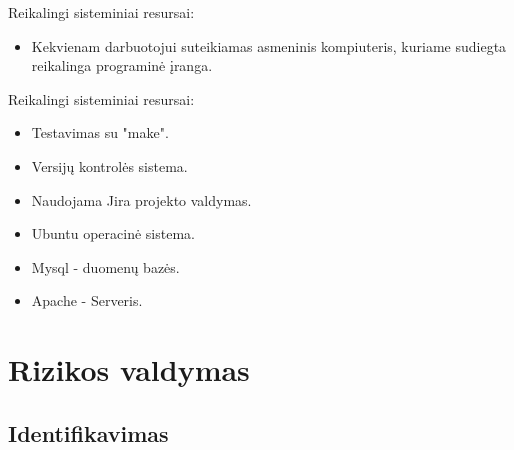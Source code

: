 \documentclass[a4paper,12pt]{article}
\begin{document}
\clearpage
Reikalingi sisteminiai resursai:
\begin{itemize}
\item Kekvienam darbuotojui suteikiamas asmeninis kompiuteris, kuriame sudiegta reikalinga programinė įranga.
\end{itemize}
Reikalingi sisteminiai resursai:
\begin{itemize}
	\item Testavimas su "make".
	\item Versijų kontrolės sistema.
	\item Naudojama Jira	projekto valdymas.
	\item Ubuntu operacinė sistema.
	\item Mysql - duomenų bazės.
	\item Apache - Serveris.
\end{itemize}

 
	

\section{Rizikos valdymas}

\subsection{Identifikavimas}



\FloatBarrier
\end{document}
